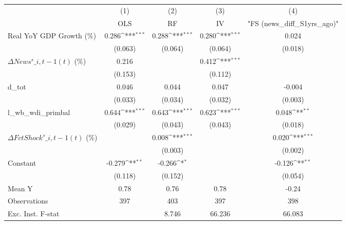 {
\def\sym#1{\ifmmode^{#1}\else\(^{#1}\)\fi}
\begin{tabular}{l*{4}{c}}
\toprule
                    &\multicolumn{1}{c}{(1)}&\multicolumn{1}{c}{(2)}&\multicolumn{1}{c}{(3)}&\multicolumn{1}{c}{(4)}\\
                    &\multicolumn{1}{c}{OLS}&\multicolumn{1}{c}{RF}&\multicolumn{1}{c}{IV}&\multicolumn{1}{c}{ "FS (news\_diff\_S1yrs\_ago)" }\\
\midrule
Real YoY GDP Growth (\%)&       0.286\sym{***}&       0.288\sym{***}&       0.280\sym{***}&       0.024         \\
                    &     (0.063)         &     (0.064)         &     (0.064)         &     (0.018)         \\
\addlinespace
$ \Delta News^s\_{i,t-1}(t)$ (\%)&       0.216         &                     &       0.412\sym{***}&                     \\
                    &     (0.153)         &                     &     (0.112)         &                     \\
\addlinespace
d\_tot               &       0.046         &       0.044         &       0.047         &      -0.004         \\
                    &     (0.033)         &     (0.034)         &     (0.032)         &     (0.003)         \\
\addlinespace
l\_wb\_wdi\_primbal    &       0.644\sym{***}&       0.643\sym{***}&       0.623\sym{***}&       0.048\sym{**} \\
                    &     (0.029)         &     (0.043)         &     (0.043)         &     (0.018)         \\
\addlinespace
$ \Delta FctShock^s\_{i,t-1}(t)$ (\%)&                     &       0.008\sym{***}&                     &       0.020\sym{***}\\
                    &                     &     (0.003)         &                     &     (0.002)         \\
\addlinespace
Constant            &      -0.279\sym{**} &      -0.266\sym{*}  &                     &      -0.126\sym{**} \\
                    &     (0.118)         &     (0.152)         &                     &     (0.054)         \\
\midrule
Mean Y              &        0.78         &        0.76         &        0.78         &       -0.24         \\
Observations        &         397         &         403         &         397         &         398         \\
Exc. Inst. F-stat   &                     &       8.746         &      66.236         &      66.083         \\
\bottomrule
\end{tabular}
}
